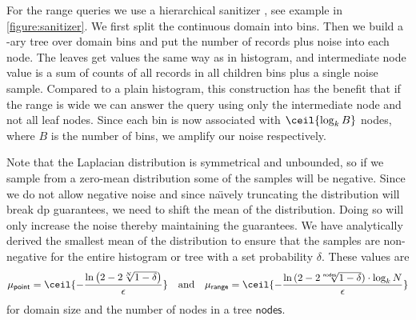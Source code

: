 			For the range queries we use a hierarchical sanitizer \cite{hierarchical-methods-for-dp}, see example in \cref{figure:sanitizer}.
			We first split the continuous domain into bins.
			Then we build a \fanout{}-ary tree over domain bins and put the number of records plus noise into each node.
			The leaves get values the same way as in histogram, and intermediate node value is a sum of counts of all records in all children bins plus a single noise sample.
			Compared to a plain histogram, this construction has the benefit that if the range is wide we can answer the query using only the intermediate node and not all leaf nodes.
			Since each bin is now associated with $\ceil{\log_\fanout B}$ nodes, where $B$ is the number of bins, we amplify our noise respectively.

			Note that the Laplacian distribution is symmetrical and unbounded, so if we sample from a zero-mean distribution some of the samples will be negative.
			Since we do not allow negative noise and since na\"{\i}vely truncating the distribution will break \acrshort{dp} guarantees, we need to shift the mean of the distribution.
			Doing so will only increase the noise thereby maintaining the guarantees.
			We have analytically derived the smallest mean of the distribution to ensure that the samples are non-negative for the entire histogram or tree with a set probability $\delta$.
			These values are
			\[
				\mu_{\mathsf{point}} = \ceil{ -\frac{ \ln \left( 2 - 2 \sqrt[\domainSize]{1 - \delta} \right) }{ \epsilon } } \quad \text{and} \quad \mu_{\mathsf{range}} = \ceil{ -\frac{ \ln{ (2 - 2 \sqrt[\mathsf{nodes}]{ 1 - \delta } ) } \cdot \log_{\fanout} \domainSize }{\epsilon} }
			\]
			for domain size \domainSize{} and the number of nodes in a tree $\mathsf{nodes}$.

